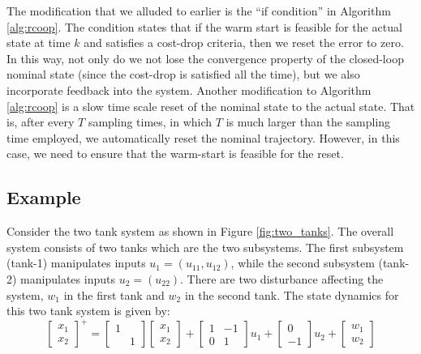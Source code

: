 \documentclass[10pt]{article}
\theoremstyle{definition}
\begin{document}
The modification that we alluded to earlier is the ``if condition'' in
Algorithm \ref{alg:rcoop}. The condition states that if the warm start
is feasible for the actual state at time $k$ and satisfies a cost-drop
criteria, then we reset the error to zero. In this way, not only do we not
lose the convergence property of the closed-loop nominal state (since
the cost-drop is satisfied all the time), but we also incorporate
feedback into the system. Another modification to Algorithm
\ref{alg:rcoop} is a slow time scale reset of the nominal state to the
actual state. That is, after every $T$ sampling times, in which $T$ is
much larger than the sampling time employed, we automatically reset
the nominal trajectory. However, in this case, we need to ensure that
the warm-start is feasible for the reset. 

\subsection{Example}
Consider the two tank system as shown in Figure
\ref{fig:two_tanks}. The overall system consists of two tanks which
are the two subsystems. The first subsystem (tank-1) manipulates inputs
$u_1 = (u_{11},u_{12})$, while the second subsystem (tank-2) manipulates
inputs $u_2 = (u_{22})$. There are two disturbance affecting the
system, $w_1$ in the first tank and $w_2$ in the second tank. The
state dynamics for this two tank system is given by:
\begin{equation*}
\begin{bmatrix}x_1\\x_2\end{bmatrix}^+ = \begin{bmatrix}1&\\ &
  1\end{bmatrix} \begin{bmatrix}x_1\\x_2\end{bmatrix}+
\begin{bmatrix} 1 & - 1 \\ 0&
  1 \end{bmatrix}u_1+ \begin{bmatrix}0\\-1\end{bmatrix}u_2
+ \begin{bmatrix}w_1\\w_2\end{bmatrix}
\end{equation*}

\begin{figure*}
\centering
\scriptsize
\resizebox{1\textwidth}{!}{}
\caption{Two tank system}
\label{fig:two_tanks}
\end{figure*}
\end{document}
